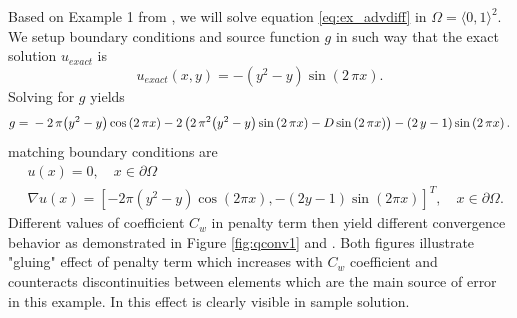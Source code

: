 \begin{example}
\label{ex:quart1}
Based on Example 1 from \cite{Antonietti2013},
we will solve equation \eqref{eq:ex_advdiff} in $\Omega = \langle 0, 1 \rangle^2$.
We setup boundary conditions and source function $g$ in such way that 
the exact solution $u_{exact}$ is
\begin{equation}
	u_{exact}(x,y) =  -{\left(y^{2} - y\right)} \sin\left(2 \, \pi x\right).
\end{equation}
Solving for $g$ yields
\begin{equation}
	g = \\
	 -2 \, \pi {\left(y^{2} - y\right)} \cos\left(2 \, \pi x\right) - 2 \, {\left(2 \, 
	 \pi^{2} 
	{\left(y^{2} - y\right)} \sin\left(2 \, \pi x\right) - D\sin\left(2 \, \pi 
	x\right)\right)} 
	 - {\left(2 \, y - 1\right)} \sin\left(2 \, \pi x\right).
\end{equation}
matching  boundary conditions are
\begin{equation}
	\begin{aligned}
	&u(x) = 0, \quad x \in \partial\Omega\\
	&\nabla u(x) = [-2\pi(y^2 - y)\cos(2 \pi x), -(2 y - 1)\sin(2\pi  x)]^T, \quad x \in 
	\partial\Omega.
	\end{aligned}
\end{equation}
Different values of coefficient $C_w$ in penalty term then yield different 
convergence behavior as demonstrated in Figure \ref{fig:qconv1} and 
. Both figures illustrate "gluing" effect of penalty term 
which increases with $C_w$ coefficient and counteracts discontinuities between elements 
which are the main source of error in this example. In  this effect 
is clearly visible in sample solution.


\end{example}
